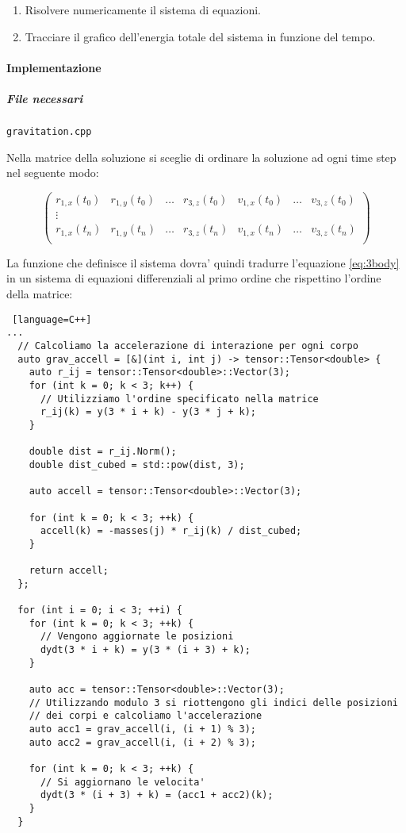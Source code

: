 \begin{enumerate}
	\item Risolvere numericamente il sistema di equazioni.
	\item Tracciare il grafico dell'energia totale del sistema in funzione del tempo.
\end{enumerate}

\paragraph{Implementazione}

\subparagraph{File necessari} \texttt{gravitation.cpp}

Nella matrice della soluzione si sceglie di ordinare la soluzione ad ogni time step nel seguente modo:

\[
	\begin{pmatrix}
		r_{1,x}(t_0) & r_{1,y}(t_0) & \dots & r_{3,z}(t_0) & v_{1,x}(t_0) & \dots & v_{3,z}(t_0) \\
		\vdots                                                                                   \\

		r_{1,x}(t_n) & r_{1,y}(t_n) & \dots & r_{3,z}(t_n) & v_{1,x}(t_n) & \dots & v_{3,z}(t_n) \\
	\end{pmatrix}
\]

La funzione che definisce il sistema dovra' quindi tradurre l'equazione \ref{eq:3body} in un sistema di equazioni differenziali al primo ordine che rispettino l'ordine della matrice:

\begin{lstlisting} [language=C++]
...
  // Calcoliamo la accelerazione di interazione per ogni corpo
  auto grav_accell = [&](int i, int j) -> tensor::Tensor<double> {
    auto r_ij = tensor::Tensor<double>::Vector(3);
    for (int k = 0; k < 3; k++) {
      // Utilizziamo l'ordine specificato nella matrice
      r_ij(k) = y(3 * i + k) - y(3 * j + k);
    }

    double dist = r_ij.Norm();
    double dist_cubed = std::pow(dist, 3);

    auto accell = tensor::Tensor<double>::Vector(3);

    for (int k = 0; k < 3; ++k) {
      accell(k) = -masses(j) * r_ij(k) / dist_cubed;
    }

    return accell;
  };

  for (int i = 0; i < 3; ++i) {
    for (int k = 0; k < 3; ++k) {
      // Vengono aggiornate le posizioni
      dydt(3 * i + k) = y(3 * (i + 3) + k);
    }

    auto acc = tensor::Tensor<double>::Vector(3);
    // Utilizzando modulo 3 si riottengono gli indici delle posizioni 
    // dei corpi e calcoliamo l'accelerazione
    auto acc1 = grav_accell(i, (i + 1) % 3);
    auto acc2 = grav_accell(i, (i + 2) % 3);

    for (int k = 0; k < 3; ++k) {
      // Si aggiornano le velocita'
      dydt(3 * (i + 3) + k) = (acc1 + acc2)(k);
    }
  }
\end{lstlisting}

